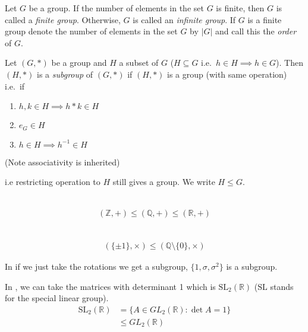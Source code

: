 \begin{definition}
Let $G$ be a group. If the number of elements in the set $G$ is finite, then $G$ is called a \emph{finite group}. Otherwise, $G$ is called an \emph{infinite group}. If $G$ is a finite group denote the number of elements in the set $G$ by $|G|$ and call this the \emph{order} of $G$.
\end{definition}

\begin{definition}[Subgroup]
Let $(G, *)$ be a group and $H$ a subset of $G$ ($H \subseteq G$ i.e.~$h \in H \implies h \in G$). Then $(H, *)$ is a \emph{subgroup} of $(G, *)$ if $(H, *)$ is a group (with same operation) i.e.~if

\begin{enumerate}
\def\labelenumi{\alph{enumi})}
\item
  $h, k \in H \implies h * k \in H$
\item
  $e_G \in H$
\item
  $h \in H \implies h^{-1} \in H$
\end{enumerate}

(Note associativity is inherited)

i.e restricting operation to $H$ still gives a group. We write $H \leq G$.
\end{definition}

\begin{example} ~\vspace*{-1.5\baselineskip}
\begin{align*}
    (\mathbb{Z}, +) \leq (\mathbb{Q}, +) \leq (\mathbb{R}, +)
\end{align*}
\end{example}

\begin{example} ~\vspace*{-1.5\baselineskip}
\begin{align*}
    (\{\pm 1\}, \times) \leq (\mathbb{Q} \setminus \{ 0 \}, \times) 
\end{align*}
\end{example}

\begin{example}
In  if we just take the rotations we get a subgroup, $\{ 1, \sigma, \sigma^2 \}$ is a subgroup.
\end{example}

\begin{example}
\protect\hypertarget{exm:sltwo}{}\label{exm:sltwo}
In , we can take the matrices with determinant 1 which is $\mathrm{SL}_2(\mathbb{R})$ ($\mathrm{SL}$ stands for the special linear group).
\begin{align*}
  \mathrm{SL}_2(\mathbb{R}) &= \{ A \in GL_2(\mathbb{R}) : \det A = 1 \} \\
    &\leq GL_2(\mathbb{R})
\end{align*}
\end{example}

